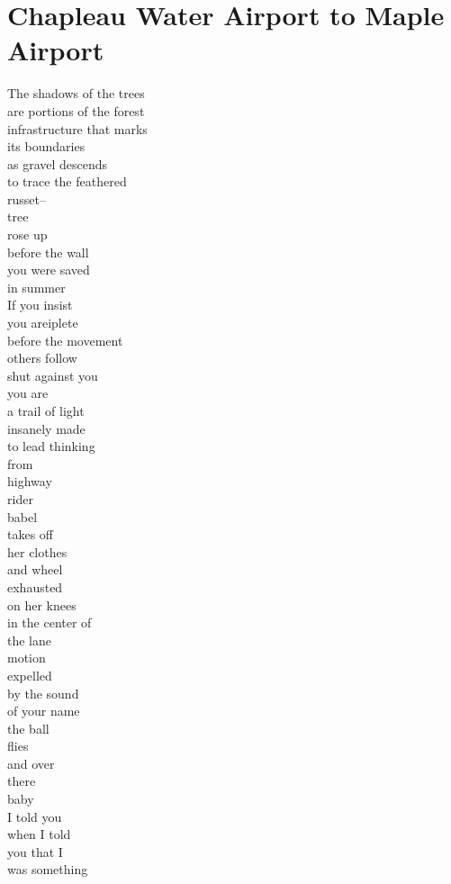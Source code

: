 \documentclass[smalldemyvopaper,11pt,twoside,onecolumn,openright,extrafontsizes]{memoir}
\begin{document}
\chapter{Chapleau Water Airport to Maple Airport}
The shadows of the trees
\\are portions of the forest
\\infrastructure that marks
\\its boundaries
\\as gravel descends
\\to trace the feathered
\\russet--
\\tree
\\rose up
\\before the wall
\\you were saved
\\in summer
\\If you insist
\\you areiplete
\\before the movement
\\others follow
\\shut against you
\\you are
\\a trail of light
\\insanely made
\\to lead thinking
\\from
\\highway
\\rider
\\babel
\\takes off
\\her clothes
\\and wheel
\\exhausted
\\on her knees
\\in the center of
\\the lane
\\motion
\\expelled
\\by the sound
\\of your name
\\the ball
\\flies
\\and over
\\there
\\baby
\\I told you
\\when I told
\\you that I
\\was something
\end{document}

